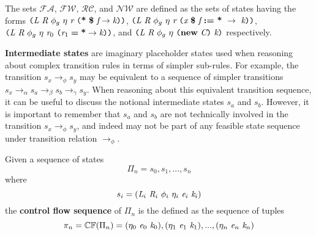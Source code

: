 %

\begin{definition}
The sets $\mathcal{FA}$, $\mathcal{FW}$, $\mathcal{RC}$, and  $\mathcal{NW}$ are defined as the sets of states having the forms $ \lp \cfgnt{L}\ \cfgnt{R}\ \phi_g\ \eta\ \cfgnt{r}\ \lp \cfgt{*}\ \cfgt{\$}\ \cfgnt{f} \rightarrow \cfgnt{k}\rp \rp$,  $\lp \cfgnt{L}\ \cfgnt{R}\ \phi_g\ \eta\ \cfgnt{r}\ \lp \cfgnt{x}\ \cfgt{\$}\ \cfgnt{f}\ \cfgt{:=}\ \cfgt{*}\ \rightarrow\ \cfgnt{k}\rp \rp$, $\texttt{(} \emph{L}\ \emph{R}\ \phi_g\ \eta\ \emph{r}_0\ \texttt{(} \emph{r}_1\; \textbf{=}\; \textbf{*} \rightarrow \emph{k}\texttt{)} \texttt{)}$, and $\texttt{(} \emph{L}\ \emph{R}\ \phi_g\ \eta\ \texttt{(} \textbf{new}\ \emph{C}\texttt{)} \ \emph{k}\texttt{)}$ respectively.
\end{definition}

\begin{definition}
\label{def:interstate}
\textbf{Intermediate states} are imaginary placeholder states used when reasoning about complex transition rules in terms of simpler sub-rules. For example, the transition $s_x \rightarrow_\phi s_y$ may be equivalent to a sequence of simpler transitions $s_x \rightarrow_\alpha s_a \rightarrow_\beta s_b \rightarrow_\gamma s_y$.  When reasoning about this equivalent transition sequence, it can be useful to discuss the notional intermediate states $s_a$ and $s_b$. However, it is important to remember that $s_a$ and $s_b$ are not technically involved in the transition $s_x \rightarrow_\phi s_y$, and indeed may not be part of any feasible state sequence under transition relation $\rightarrow_\phi$.
\end{definition}

\begin{definition}
Given a sequence of states $$\Pi_n = s_0,s_1,...,s_n$$ where $$s_i = (\cfgnt{L}_i\ \cfgnt{R}_i\ \phi_i\ \eta_i\ \cfgnt{e}_i\ \cfgnt{k}_i )$$ the \textbf{control flow sequence} of $\Pi_n$ is the defined as the sequence of tuples $$ \pi_n = \mathbb{CF}(\Pi_n) = (\eta_0\ \cfgnt{e}_0\ \cfgnt{k}_0),(\eta_1\ \cfgnt{e}_1\ \cfgnt{k}_1),...,(\eta_n\ \cfgnt{e}_n\ \cfgnt{k}_n)$$
\end{definition}

